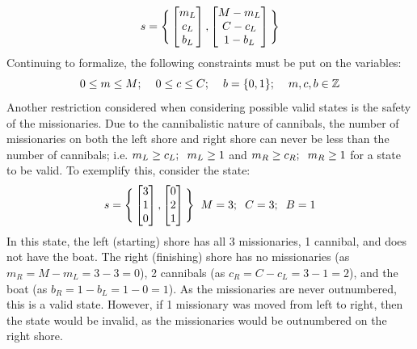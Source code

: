 \documentclass[11pt]{article}
\begin{document}
 \begin{equation}
s= 
\Bigg{\{}
\begin{bmatrix}
m_L\\
c_L\\
b_L
\end{bmatrix},
\begin{bmatrix}
M-m_L\\
C-c_L\\
1-b_L
\end{bmatrix}
\Bigg{\}}
\end{equation}
Continuing to formalize, the following constraints must be put on the variables:
\begin{equation}
0\leq m \leq M; \hspace{0.4cm}0 \leq c \leq C; \hspace{0.4cm} b=\{0,1\}; \hspace{0.4cm} m,c,b \in \mathbb{Z}
\end{equation}
Another restriction considered when considering possible valid states is the safety of the missionaries. Due to the cannibalistic nature of cannibals, the number of missionaries on both the left shore and right shore can never be less than the number of cannibals; i.e. \(m_L \geq c_L;\hspace{0.2cm} m_L \geq1\) and \(m_R \geq c_R;\hspace{0.2cm} m_R \geq1\) for a state to be valid.
To exemplify this, consider the state: 
 \begin{equation}
s= 
\Bigg{\{}
\begin{bmatrix}
3\\
1\\
0
\end{bmatrix},
\begin{bmatrix}
0\\
2\\
1
\end{bmatrix}
\Bigg{\}}
\hspace{0.2cm} M=3;\hspace{0.2cm} C=3; \hspace{0.2cm} B=1
\end{equation}
In this state, the left (starting) shore has all 3 missionaries, 1 cannibal, and does not have the boat. The right (finishing) shore has no missionaries (as \(m_{R} =M- m_{L}=3-3=0\)), 2 cannibals (as \(c_{R} =C- c_{L}=3-1=2\)), and the boat (as \(b_{R} =1- b_{L}=1-0=1\)). As the missionaries are never outnumbered, this is a valid state. However, if 1 missionary was moved from left to right, then the state would be invalid, as the missionaries would be outnumbered on the right shore.
\end{document}
